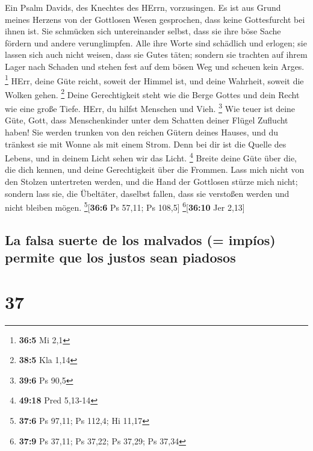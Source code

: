  Ein Psalm Davids, des Knechtes des HErrn, vorzusingen.
 Es ist aus Grund meines Herzens von der Gottlosen Wesen
gesprochen, dass keine Gottesfurcht bei ihnen ist.  Sie
schmücken sich untereinander selbst, dass sie ihre böse Sache fördern
und andere verunglimpfen.  Alle ihre Worte sind schädlich
und erlogen; sie lassen sich auch nicht weisen, dass sie Gutes täten;
 sondern sie trachten auf ihrem Lager nach Schaden und
stehen fest auf dem bösen Weg und scheuen kein Arges. \footnote{\textbf{36:5}
  Mi 2,1}  HErr, deine Güte reicht, soweit der Himmel ist,
und deine Wahrheit, soweit die Wolken gehen. \footnote{\textbf{38:5} Kla
  1,14}  Deine Gerechtigkeit steht wie die Berge Gottes
und dein Recht wie eine große Tiefe. HErr, du hilfst Menschen und Vieh.
\footnote{\textbf{39:6} Ps 90,5}  Wie teuer ist deine
Güte, Gott, dass Menschenkinder unter dem Schatten deiner Flügel
Zuflucht haben!  Sie werden trunken von den reichen Gütern
deines Hauses, und du tränkest sie mit Wonne als mit einem Strom.
 Denn bei dir ist die Quelle des Lebens, und in deinem
Licht sehen wir das Licht. \footnote{\textbf{49:18} Pred 5,13-14}
 Breite deine Güte über die, die dich kennen, und deine
Gerechtigkeit über die Frommen.  Lass mich nicht von den
Stolzen untertreten werden, und die Hand der Gottlosen stürze mich
nicht;  sondern lass sie, die Übeltäter, daselbst fallen,
dass sie verstoßen werden und nicht bleiben mögen.
\footnote{\textbf{37:6} Ps 97,11; Ps 112,4; Hi 11,17}{[}\textbf{36:6} Ps
57,11; Ps 108,5{]} \footnote{\textbf{37:9} Ps 37,11; Ps 37,22; Ps 37,29;
  Ps 37,34}{[}\textbf{36:10} Jer 2,13{]}

\hypertarget{la-falsa-suerte-de-los-malvados-impuxedos-permite-que-los-justos-sean-piadosos}{%
\subsection{La falsa suerte de los malvados (= impíos) permite que los
justos sean
piadosos}\label{la-falsa-suerte-de-los-malvados-impuxedos-permite-que-los-justos-sean-piadosos}}

\hypertarget{section-36}{%
\section{37}\label{section-36}}

